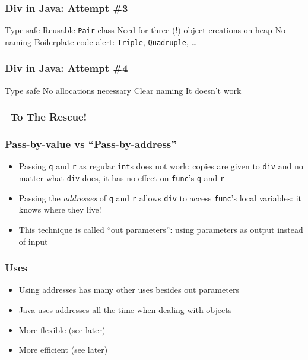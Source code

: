 \documentclass{../ucll-slides}
\begin{document}
\begin{frame}
  \frametitle{Div in Java: Attempt \#3}
  \begin{procontralist}
     Type safe
     Reusable {\tt Pair} class
     Need for three (!) object creations on heap
     No naming
     Boilerplate code alert: {\tt Triple}, {\tt Quadruple}, \dots
  \end{procontralist}
\end{frame}

\begin{frame}
  \frametitle{Div in Java: Attempt \#4}
  \begin{procontralist}
     Type safe
     No allocations necessary
     Clear naming
     It doesn't work \frownie
  \end{procontralist}
\end{frame}

\begin{frame}
  \frametitle{\cpp\ To The Rescue!}
\end{frame}

\begin{frame}
  \frametitle{Pass-by-value vs ``Pass-by-address''}
  \begin{itemize}
    \item Passing {\tt q} and {\tt r} as regular {\tt int}s does not work:
          copies are given to {\tt div} and no matter what {\tt div} does,
          it has no effect on {\tt func}'s {\tt q} and {\tt r}
    \item Passing the \emph{addresses} of {\tt q} and {\tt r}
          allows {\tt div} to access {\tt func}'s local variables:
          it knows where they live!
    \item This technique is called ``out parameters'': using parameters as output instead of input
  \end{itemize}
\end{frame}

\begin{frame}
  \frametitle{Uses}
  \begin{itemize}
    \item Using addresses has many other uses besides out parameters
    \item Java uses addresses all the time when dealing with objects
    \item More flexible (see later)
    \item More efficient (see later)
  \end{itemize}
\end{frame}
\end{document}
